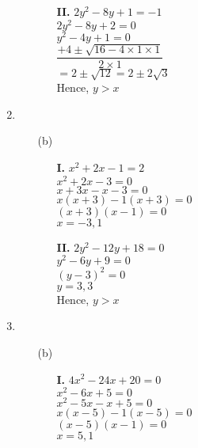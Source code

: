 \begin{multicols}{2}
\begin{enumerate}
\begin{itemize}
\begin{itemize}
    \item[{\bf II.}] $2y^2 - 8y + 1 = -1$\\
      $2y^2 - 8y + 2 = 0$\\
      $y^2 - 4y + 1 = 0$\\[0.2cm]
      $\dfrac{+4 \pm \sqrt{16 - 4 \times 1 \times 1}}{2 \times 1}$\\[0.2cm]
      $= 2 \pm \sqrt{12} = 2 \pm 2\sqrt{3}$\\
      Hence, $y > x$
      \end{itemize}
    \end{itemize}
\item
  \begin{itemize}
  \item[(b)]
    \begin{itemize}
    \item[{\bf I.}] $x^2 + 2x - 1 = 2$\\
      $x^2 + 2x - 3 = 0$\\
      $x + 3x - x - 3 = 0$\\
      $x(x + 3) - 1(x + 3) = 0$\\
      $(x + 3)(x - 1) = 0$\\
      $x = -3, 1$

    \item[{\bf II.}] $2y^2 - 12y + 18 = 0$\\
      $y^2 - 6y + 9 = 0$\\
      $(y - 3)^2 = 0$\\
      $y = 3, 3$\\
      Hence, $y > x$
      \end{itemize}
  \end{itemize}
\item
  \begin{itemize}
  \item[(b)]
    \begin{itemize}
    \item[{\bf I.}] $4x^2 - 24x + 20 = 0$\\
      $x^2 - 6x + 5 = 0$\\
      $x^2 - 5x - x + 5 = 0$\\
      $x(x - 5) -1 (x - 5) = 0$\\
      $(x - 5)(x - 1) = 0$\\
      $x = 5, 1$


\end{itemize}
\end{itemize}
\end{enumerate}
\end{multicols}
